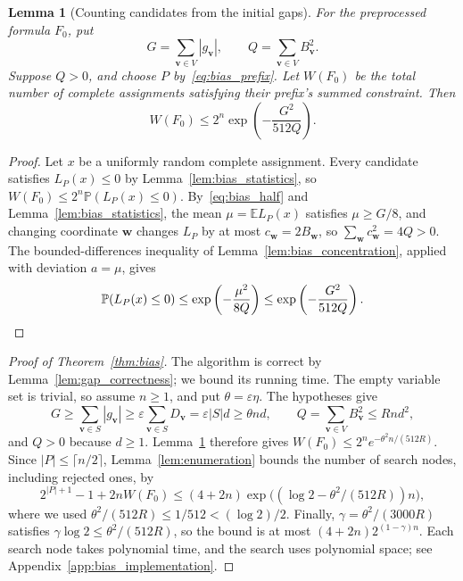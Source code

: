 \documentclass[11pt,a4paper]{article}
\newtheorem{lemma}[theorem]{Lemma}
\theoremstyle{definition}
\theoremstyle{remark}
\newcommand{\E}{\mathbb E}
\newcommand{\Prb}{\mathbb P}
\begin{document}
\begin{lemma}[Counting candidates from the initial gaps]\label{lem:bias_count}
For the preprocessed formula $F_0$, put
\[
 G=\sum_{\mathbf v\in V}|g_{\mathbf v}|,\qquad
 Q=\sum_{\mathbf v\in V}B_{\mathbf v}^2.
\]
Suppose $Q>0$, and choose $P$ by~\eqref{eq:bias_prefix}. Let $W(F_0)$ be
the total number of complete assignments satisfying their prefix's
summed constraint. Then
\begin{equation}
 W(F_0)\le2^n\exp\left(-\frac{G^2}{512Q}\right).
 \label{eq:bias_count}
\end{equation}
\end{lemma}
\begin{proof}
Let $x$ be a uniformly random complete assignment. Every candidate
satisfies $L_P(x)\le0$ by Lemma~\ref{lem:bias_statistics}, so
$W(F_0)\le2^n\Prb(L_P(x)\le0)$. By~\eqref{eq:bias_half} and
Lemma~\ref{lem:bias_statistics}, the mean $\mu=\E L_P(x)$ satisfies
$\mu\ge G/8$, and changing coordinate $\mathbf w$ changes $L_P$ by at most
$c_{\mathbf w}=2B_{\mathbf w}$, so $\sum_{\mathbf w}c_{\mathbf w}^2=4Q>0$.
The bounded-differences inequality of
Lemma~\ref{lem:bias_concentration}, applied with deviation $a=\mu$, gives
\[
 \Prb(L_P(x)\le0)\le\exp\left(-\frac{\mu^2}{8Q}\right)
 \le\exp\left(-\frac{G^2}{512Q}\right).\qedhere
\]
\end{proof}

\begin{proof}[Proof of Theorem~\ref{thm:bias}]
The algorithm is correct by Lemma~\ref{lem:gap_correctness}; we bound its
running time. The empty variable set is trivial, so assume $n\ge1$, and
put $\theta=\varepsilon\eta$. The hypotheses give
\[
 G\ge\sum_{\mathbf v\in S}|g_{\mathbf v}|
   \ge\varepsilon\sum_{\mathbf v\in S}D_{\mathbf v}
   =\varepsilon|S|d\ge\theta nd,
 \qquad
 Q=\sum_{\mathbf v\in V}B_{\mathbf v}^2\le Rnd^2,
\]
and $Q>0$ because $d\ge1$. Lemma~\ref{lem:bias_count} therefore gives
$W(F_0)\le2^n e^{-\theta^2n/(512R)}$. Since $|P|\le\lceil n/2\rceil$,
Lemma~\ref{lem:enumeration} bounds the number of search nodes, including
rejected ones, by
\[
 2^{|P|+1}-1+2nW(F_0)
 \le(4+2n)\exp\bigl((\log2-\theta^2/(512R))n\bigr),
\]
where we used $\theta^2/(512R)\le1/512<(\log2)/2$. Finally,
$\gamma=\theta^2/(3000R)$ satisfies $\gamma\log2\le\theta^2/(512R)$, so
the bound is at most $(4+2n)2^{(1-\gamma)n}$. Each search node takes
polynomial time, and the search uses polynomial space; see
Appendix~\ref{app:bias_implementation}.
\end{proof}
\end{document}
